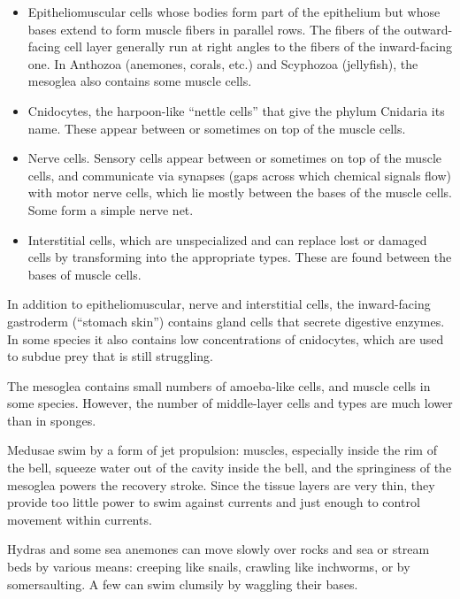 \begin{itemize}
\tightlist
\item
  Epitheliomuscular cells whose bodies form part of the epithelium but whose bases extend to form muscle fibers in parallel rows. The fibers of the outward-facing cell layer generally run at right angles to the fibers of the inward-facing one. In Anthozoa (anemones, corals, etc.) and Scyphozoa (jellyfish), the mesoglea also contains some muscle cells.
\item
  Cnidocytes, the harpoon-like ``nettle cells'' that give the phylum Cnidaria its name. These appear between or sometimes on top of the muscle cells.
\item
  Nerve cells. Sensory cells appear between or sometimes on top of the muscle cells, and communicate via synapses (gaps across which chemical signals flow) with motor nerve cells, which lie mostly between the bases of the muscle cells. Some form a simple nerve net.
\item
  Interstitial cells, which are unspecialized and can replace lost or damaged cells by transforming into the appropriate types. These are found between the bases of muscle cells.
\end{itemize}

In addition to epitheliomuscular, nerve and interstitial cells, the inward-facing gastroderm (``stomach skin'') contains gland cells that secrete digestive enzymes. In some species it also contains low concentrations of cnidocytes, which are used to subdue prey that is still struggling.

The mesoglea contains small numbers of amoeba-like cells, and muscle cells in some species. However, the number of middle-layer cells and types are much lower than in sponges.

Medusae swim by a form of jet propulsion: muscles, especially inside the rim of the bell, squeeze water out of the cavity inside the bell, and the springiness of the mesoglea powers the recovery stroke. Since the tissue layers are very thin, they provide too little power to swim against currents and just enough to control movement within currents.

Hydras and some sea anemones can move slowly over rocks and sea or stream beds by various means: creeping like snails, crawling like inchworms, or by somersaulting. A few can swim clumsily by waggling their bases.

